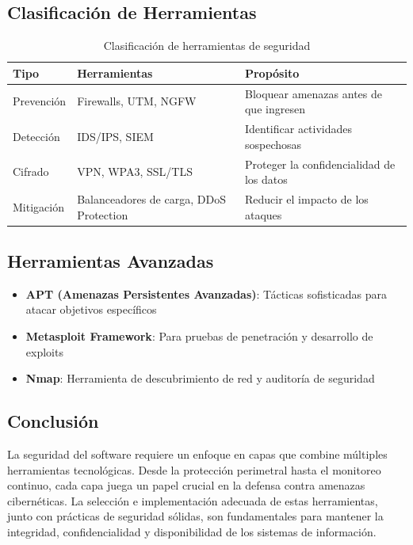 \documentclass[12pt,a4paper]{article}
\begin{document}
\subsection{Clasificación de Herramientas}
\begin{table}[H]
    \centering
    \begin{tabular}{|l|l|l|}
    \hline
    \textbf{Tipo} & \textbf{Herramientas} & \textbf{Propósito} \\ \hline
    Prevención & Firewalls, UTM, NGFW & Bloquear amenazas antes de que ingresen \\ \hline
    Detección & IDS/IPS, SIEM & Identificar actividades sospechosas \\ \hline
    Cifrado & VPN, WPA3, SSL/TLS & Proteger la confidencialidad de los datos \\ \hline
    Mitigación & Balanceadores de carga, DDoS Protection & Reducir el impacto de los ataques \\ \hline
    \end{tabular}
    \caption{Clasificación de herramientas de seguridad}
    \label{tab:herramientas}
\end{table}

\subsection{Herramientas Avanzadas}
\begin{itemize}
    \item \textbf{APT (Amenazas Persistentes Avanzadas)}: Tácticas sofisticadas para atacar objetivos específicos
    \item \textbf{Metasploit Framework}: Para pruebas de penetración y desarrollo de exploits
    \item \textbf{Nmap}: Herramienta de descubrimiento de red y auditoría de seguridad
\end{itemize}

\subsection{Conclusión}
La seguridad del software requiere un enfoque en capas que combine múltiples herramientas tecnológicas. Desde la protección perimetral hasta el monitoreo continuo, cada capa juega un papel crucial en la defensa contra amenazas cibernéticas. La selección e implementación adecuada de estas herramientas, junto con prácticas de seguridad sólidas, son fundamentales para mantener la integridad, confidencialidad y disponibilidad de los sistemas de información.
\end{document}
